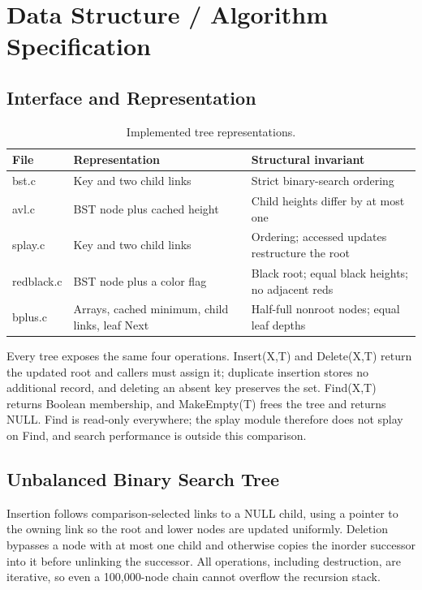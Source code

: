 \section{Data Structure / Algorithm Specification}

\subsection{Interface and Representation}

\begin{table}[H]
\centering
\small
\caption{Implemented tree representations.}
\begin{tabularx}{\textwidth}{lXX}
\toprule
File & Representation & Structural invariant \\
\midrule
bst.c & Key and two child links & Strict binary-search ordering \\
avl.c & BST node plus cached height & Child heights differ by at most one \\
splay.c & Key and two child links & Ordering; accessed updates restructure the root \\
redblack.c & BST node plus a color flag & Black root; equal black heights; no adjacent reds \\
bplus.c & Arrays, cached minimum, child links, leaf Next & Half-full nonroot nodes; equal leaf depths \\
\bottomrule
\end{tabularx}
\end{table}
\FloatBarrier

Every tree exposes the same four operations. Insert(X,T) and Delete(X,T) return the updated root and callers must assign it; duplicate insertion stores no additional record, and deleting an absent key preserves the set. Find(X,T) returns Boolean membership, and MakeEmpty(T) frees the tree and returns NULL. Find is read-only everywhere; the splay module therefore does not splay on Find, and search performance is outside this comparison.

\subsection{Unbalanced Binary Search Tree}

Insertion follows comparison-selected links to a NULL child, using a pointer to the owning link so the root and lower nodes are updated uniformly. Deletion bypasses a node with at most one child and otherwise copies the inorder successor into it before unlinking the successor. All operations, including destruction, are iterative, so even a 100,000-node chain cannot overflow the recursion stack.

